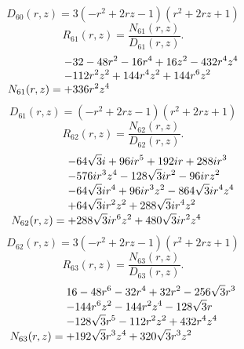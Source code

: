 \documentclass[11pt,a4paper]{article}
\begin{document}
\begin{equation}
D_{60}(r,z)=3 \left(- r^{2} + 2 r z - 1\right) \left(r^{2} + 2 r z + 1\right)
\label{eq:cat-denominator-60}
\end{equation}
\begin{equation}
R_{61}(r,z)=\frac{N_{61}(r,z)}{D_{61}(r,z)}.
\label{eq:cat-rational-61}
\end{equation}
\begin{equation}
N_{61}(r,z)=\shortstack[l]{$\displaystyle  - 32 - 48 r^{2} - 16 r^{4} + 16 z^{2} - 432 r^{4} z^{4}$\\
$\displaystyle  - 112 r^{2} z^{2} + 144 r^{4} z^{2} + 144 r^{6} z^{2}$\\
$\displaystyle  + 336 r^{2} z^{4}$}
\label{eq:cat-numerator-61}
\end{equation}
\begin{equation}
D_{61}(r,z)=\left(- r^{2} + 2 r z - 1\right) \left(r^{2} + 2 r z + 1\right)
\label{eq:cat-denominator-61}
\end{equation}
\begin{equation}
R_{62}(r,z)=\frac{N_{62}(r,z)}{D_{62}(r,z)}.
\label{eq:cat-rational-62}
\end{equation}
\begin{equation}
N_{62}(r,z)=\shortstack[l]{$\displaystyle  - 64 \sqrt{3} i + 96 i r^{5} + 192 i r + 288 i r^{3}$\\
$\displaystyle  - 576 i r^{3} z^{4} - 128 \sqrt{3} i r^{2} - 96 i r z^{2}$\\
$\displaystyle  - 64 \sqrt{3} i r^{4} + 96 i r^{3} z^{2} - 864 \sqrt{3} i r^{4} z^{4}$\\
$\displaystyle  + 64 \sqrt{3} i r^{2} z^{2} + 288 \sqrt{3} i r^{4} z^{2}$\\
$\displaystyle  + 288 \sqrt{3} i r^{6} z^{2} + 480 \sqrt{3} i r^{2} z^{4}$}
\label{eq:cat-numerator-62}
\end{equation}
\begin{equation}
D_{62}(r,z)=3 \left(- r^{2} + 2 r z - 1\right) \left(r^{2} + 2 r z + 1\right)
\label{eq:cat-denominator-62}
\end{equation}
\begin{equation}
R_{63}(r,z)=\frac{N_{63}(r,z)}{D_{63}(r,z)}.
\label{eq:cat-rational-63}
\end{equation}
\begin{equation}
N_{63}(r,z)=\shortstack[l]{$\displaystyle 16 - 48 r^{6} - 32 r^{4} + 32 r^{2} - 256 \sqrt{3} r^{3}$\\
$\displaystyle  - 144 r^{6} z^{2} - 144 r^{2} z^{4} - 128 \sqrt{3} r$\\
$\displaystyle  - 128 \sqrt{3} r^{5} - 112 r^{2} z^{2} + 432 r^{4} z^{4}$\\
$\displaystyle  + 192 \sqrt{3} r^{3} z^{4} + 320 \sqrt{3} r^{3} z^{2}$}
\label{eq:cat-numerator-63}
\end{equation}
\end{document}
